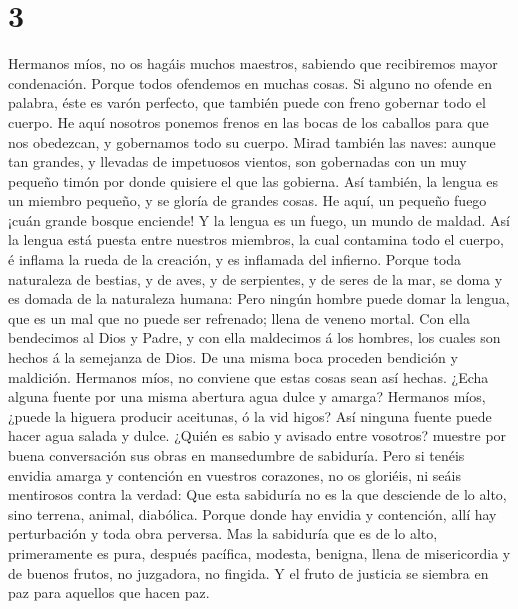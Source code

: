 \hypertarget{section-2}{%
\section{3}\label{section-2}}

 Hermanos míos, no os hagáis muchos maestros, sabiendo que
recibiremos mayor condenación.  Porque todos ofendemos en
muchas cosas. Si alguno no ofende en palabra, éste es varón perfecto,
que también puede con freno gobernar todo el cuerpo.  He
aquí nosotros ponemos frenos en las bocas de los caballos para que nos
obedezcan, y gobernamos todo su cuerpo.  Mirad también las
naves: aunque tan grandes, y llevadas de impetuosos vientos, son
gobernadas con un muy pequeño timón por donde quisiere el que las
gobierna.  Así también, la lengua es un miembro pequeño, y
se gloría de grandes cosas. He aquí, un pequeño fuego ¡cuán grande
bosque enciende!  Y la lengua es un fuego, un mundo de
maldad. Así la lengua está puesta entre nuestros miembros, la cual
contamina todo el cuerpo, é inflama la rueda de la creación, y es
inflamada del infierno.  Porque toda naturaleza de bestias,
y de aves, y de serpientes, y de seres de la mar, se doma y es domada de
la naturaleza humana:  Pero ningún hombre puede domar la
lengua, que es un mal que no puede ser refrenado; llena de veneno
mortal.  Con ella bendecimos al Dios y Padre, y con ella
maldecimos á los hombres, los cuales son hechos á la semejanza de Dios.
 De una misma boca proceden bendición y maldición. Hermanos
míos, no conviene que estas cosas sean así hechas.  ¿Echa
alguna fuente por una misma abertura agua dulce y amarga? 
Hermanos míos, ¿puede la higuera producir aceitunas, ó la vid higos? Así
ninguna fuente puede hacer agua salada y dulce.  ¿Quién es
sabio y avisado entre vosotros? muestre por buena conversación sus obras
en mansedumbre de sabiduría.  Pero si tenéis envidia amarga
y contención en vuestros corazones, no os gloriéis, ni seáis mentirosos
contra la verdad:  Que esta sabiduría no es la que
desciende de lo alto, sino terrena, animal, diabólica. 
Porque donde hay envidia y contención, allí hay perturbación y toda obra
perversa.  Mas la sabiduría que es de lo alto, primeramente
es pura, después pacífica, modesta, benigna, llena de misericordia y de
buenos frutos, no juzgadora, no fingida.  Y el fruto de
justicia se siembra en paz para aquellos que hacen paz.

